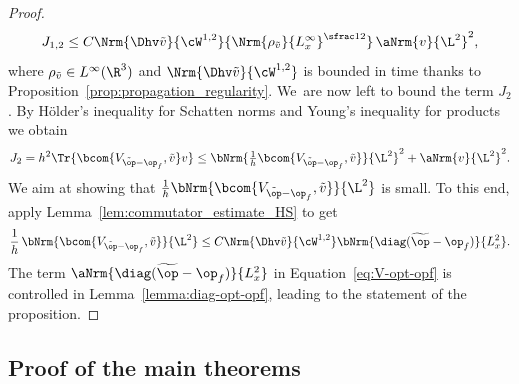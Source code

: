 \begin{proof}
\begin{equation*}
J_{1,2} \leq C \Nrm{\Dhv \tilde{v}}{\cW^{1,2}} {\Nrm{\rho_{\tilde v}}{L^\infty_x}^{\sfrac12}}\, \aNrm{v}{\L^2}^2,
\end{equation*}
where $\rho_{\tilde v}\in L^\infty(\R^3)$ and $\Nrm{\Dhv \tilde{v}}{\cW^{1,2}}$ is bounded in time thanks to Proposition~\ref{prop:propagation_regularity}. We~are now left to bound the term $J_2$. By Hölder's inequality for Schatten norms and Young's inequality for products we obtain
\begin{equation*}
J_2 = h^2 \Tr{\bcom{V_{\tilde{\op}-\op_f},\tilde{v}}v} \leq \bNrm{\tfrac{1}{h}\bcom{V_{\tilde{\op}-\op_f},\tilde{v}}}{\L^2}^2+ \aNrm{v}{\L^2}^2.
\end{equation*}
We aim at showing that $\tfrac{1}{h}\bNrm{\bcom{V_{\tilde{\op}-\op_f},\tilde{v}}}{\L^2}$ is small. To this end, apply Lemma~\ref{lem:commutator_estimate_HS} to get
\begin{equation}\label{eq:V-opt-opf}
\frac{1}{h}\,\bNrm{\bcom{V_{\tilde{\op}-\op_f},\tilde{v}}}{\L^2} \leq C \Nrm{\Dhv \tilde{v}}{\cW^{1,2}} \bNrm{\diag(\widetilde{\op}-\op_f)}{L^2_x}.
\end{equation}
The term $\aNrm{\diag(\widetilde{\op}-\op_f)}{L^2_x}$ in Equation~\eqref{eq:V-opt-opf} is controlled in Lemma~\ref{lemma:diag-opt-opf}, leading to the statement of the proposition.
\end{proof}

\subsection{Proof of the main theorems}

